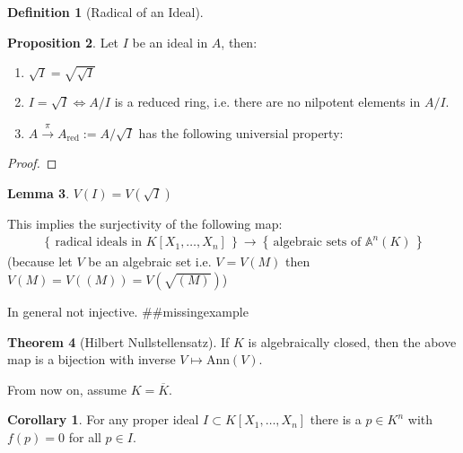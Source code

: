 \documentclass[a4paper]{book}
\theoremstyle{definition}
\newtheorem{definition}{Definition}[]
\newtheorem{theorem}[definition]{Theorem}
\newtheorem{corollary}{Corollary}
\newtheorem{lemma}[definition]{Lemma}
\newtheorem{proposition}[definition]{Proposition}
\newcommand{\set}[1]{\left\{\, #1 \,\right\}}
\begin{document}
\begin{defbox}    
    \begin{definition}[Radical of an Ideal]

    \end{definition}
\end{defbox}
\begin{thmbox}
    \begin{proposition}
        Let \(I\) be an ideal in \(A\), then:
        \begin{enumerate}
            \item \(\sqrt{I} = \sqrt{\sqrt{I}}\)
            \item \(I = \sqrt{I} \iff A / I\) is a reduced ring, i.e. there are no nilpotent elements in \(A / I\).
            \item \(A \overset{\pi}{\longrightarrow} A_\text{red} := A / \sqrt{I}\) has the following universial property:
        \end{enumerate}
    \end{proposition}
\end{thmbox}
\begin{proof}
    
\end{proof}
\begin{thmbox}
    \begin{lemma}
        \(V(I) = V(\sqrt{I})\)
    \end{lemma}
\end{thmbox}
This implies the surjectivity of the following map:
\begin{align*}
    \set{\text{radical ideals in } K[X_1, \ldots, X_n]} \rightarrow \set{\text{algebraic sets of }\mathbb{A}^n(K)}
\end{align*}
(because let \(V\) be an algebraic set i.e. \(V = V(M)\)
then \(V(M) = V((M)) = V(\sqrt{(M)})\))

In general not injective. \#\#missingexample


\begin{thmbox}
    \begin{theorem}[Hilbert Nullstellensatz]
        If \(K\) is algebraically closed, then the above map is a bijection with inverse \(V \mapsto \text{Ann}(V)\).
    \end{theorem}
\end{thmbox}

From now on, assume \(K = \overline{K}\).

\begin{corollary}
    For any proper ideal \(I \subset K[X_1, \ldots, X_n]\) there is a \(p \in K^n\) with \(f(p) = 0\) for all \(p \in I\).
\end{corollary}
\end{document}

